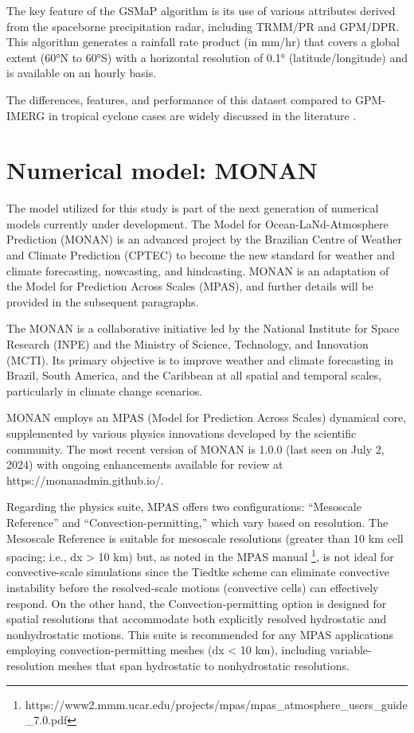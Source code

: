 The key feature of the GSMaP algorithm is its use of various attributes derived from the spaceborne precipitation radar, including TRMM/PR and GPM/DPR. This algorithm generates a rainfall rate product (in mm/hr) that covers a global extent (60°N to 60°S) with a horizontal resolution of 0.1° (latitude/longitude) and is available on an hourly basis.

The differences, features, and performance of this dataset compared to GPM-IMERG in tropical cyclone cases are widely discussed in the literature \cite{reddy2022accurately, bagtasa2022assessment, yang2024evaluation}.

\section{Numerical model: MONAN}

The model utilized for this study is part of the next generation of numerical models currently under development. The Model for Ocean-LaNd-Atmosphere Prediction (MONAN) is an advanced project by the Brazilian Centre of Weather and Climate Prediction (CPTEC) to become the new standard for weather and climate forecasting, nowcasting, and hindcasting. MONAN is an adaptation of the Model for Prediction Across Scales (MPAS), and further details will be provided in the subsequent paragraphs. 

The MONAN is a collaborative initiative led by the National Institute for Space Research (INPE) and the Ministry of Science, Technology, and Innovation (MCTI). Its primary objective is to improve weather and climate forecasting in Brazil, South America, and the Caribbean at all spatial and temporal scales, particularly in climate change scenarios.

MONAN employs an MPAS (Model for Prediction Across Scales) dynamical core, supplemented by various physics innovations developed by the scientific community. The most recent version of MONAN is 1.0.0 (last seen on July 2, 2024) with ongoing enhancements available for review at https://monanadmin.github.io/.

Regarding the physics suite, MPAS offers two configurations: “Mesoscale Reference” and “Convection-permitting,” which vary based on resolution. The Mesoscale Reference is suitable for mesoscale resolutions (greater than 10 km cell spacing; i.e., dx > 10 km) but, as noted in the MPAS manual \footnote{https://www2.mmm.ucar.edu/projects/mpas/mpas\_atmosphere\_users\_guide\_7.0.pdf}, 
is not ideal for convective-scale simulations since the Tiedtke scheme can eliminate convective instability before the resolved-scale motions (convective cells) can effectively respond. On the other hand, the Convection-permitting option is designed for spatial resolutions that accommodate both explicitly resolved hydrostatic and nonhydrostatic motions. This suite is recommended for any MPAS applications employing convection-permitting meshes (dx < 10 km), including variable-resolution meshes that span hydrostatic to nonhydrostatic resolutions.

